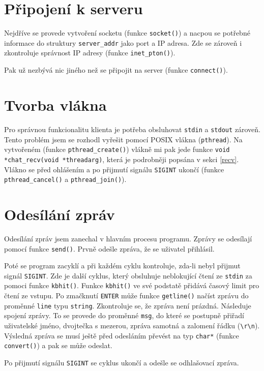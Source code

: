 \documentclass[a4paper, 11pt]{article}
\begin{document}
\section{Připojení k serveru}

Nejdříve se provede vytvoření socketu (funkce \texttt{socket()}) a nacpou se potřebné informace do struktury \texttt{server\_addr} jako port a IP adresa. Zde se zároveň i zkontroluje správnost IP adresy (funkce \texttt{inet\_pton()}).

Pak už nezbývá nic jiného než se připojit na server (funkce \texttt{connect()}).

\section{Tvorba vlákna}

Pro správnou funkcionalitu klienta je potřeba obsluhovat \texttt{stdin} a \texttt{stdout} zároveň. Tento problém jsem se rozhodl vyřešit pomocí POSIX vlákna (\texttt{pthread}). Na vytvořeném (funkce \texttt{pthread\_create()}) vlákně mi pak jede funkce \texttt{void *chat\_recv(void *threadarg)}, která je podrobněji popsána v sekci \ref{recv}. Vlákno se před ohlášením a po přijmutí signálu \texttt{SIGINT} ukončí (funkce \texttt{pthread\_cancel()} a \texttt{pthread\_join()}).

\section{Odesílání zpráv}

Odesílání zpráv jsem zanechal v hlavním procesu programu. Zprávy se odesílají pomocí funkce \texttt{send()}. Prvně odešle zpráva, že se uživatel přihlásil. 

Poté se program zacyklí a při každém cyklu kontroluje, zda-li nebyl přijmut signál \texttt{SIGINT}. Zde je další cyklus, který obsluhuje neblokující čtení ze \texttt{stdin} za pomoci funkce \texttt{kbhit()}. Funkce \texttt{kbhit()} ve své podstatě přidává časový limit pro čtení ze vstupu. Po zmačknutí \texttt{ENTER} může funkce \texttt{getline()} načíst zprávu do proměnné \texttt{line} typu \texttt{string}. Zkontroluje se, že zpráva není prázdná. Následuje spojení zprávy. To se provede do proměnné \texttt{msg}, do které se postupně přiřadí uživatelské jméno, dvojtečka s mezerou, zpráva samotná a zalomení řádku (\verb|\r\n|). Výsledná zpráva se musí ještě před odesláním převést na typ \texttt{char*} (funkce \texttt{convert()}) a pak se může odeslat.

Po přijmutí signálu \texttt{SIGINT} se cyklus ukončí a odešle se odhlašovací zpráva.
\end{document}

